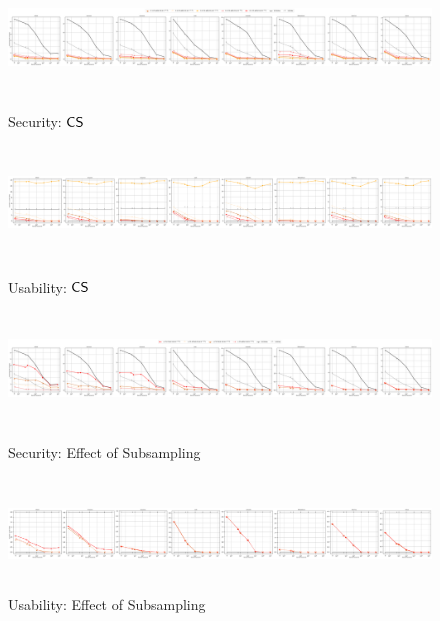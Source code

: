 \begin{figure}
	\includegraphics[width=\linewidth, height = 3cm]{Figures/Experiments/Attacker/SecurityPsiCompare}
	\vspace{-0.2in}
	\caption[Security: Selection Optimal $\hitCountThreshold$]{Security: $\mathsf{CS}$}
	\label{fig:securitypsicompare}
	\includegraphics[width=\linewidth, height = 3cm]{Figures/Experiments/Utility/UsabilityPsiCompare}
	\vspace{-0.2in}
	\caption[Security: Selection Optimal $\hitCountThreshold$]{Usability: $\mathsf{CS}$}
	\label{fig:usabilitypsicompare}
	
	\includegraphics[width=\linewidth, height = 3cm]{Figures/Experiments/Attacker/SecuritySampleCompare}
	\vspace{-0.2in}
	\caption[Security: Selection Optimal Subsamping]{Security: Effect of Subsampling}
	\label{fig:securitysamplecompare}
	
	\includegraphics[width=\linewidth, height = 3cm]{Figures/Experiments/Utility/UsabilitySampleCompare}
	\vspace{-0.2in}
	\caption[Usability: Selection Optimal Subsamping]{Usability: Effect of Subsampling}
	\label{fig:usabilitysamplecompare}
	

\end{figure}
